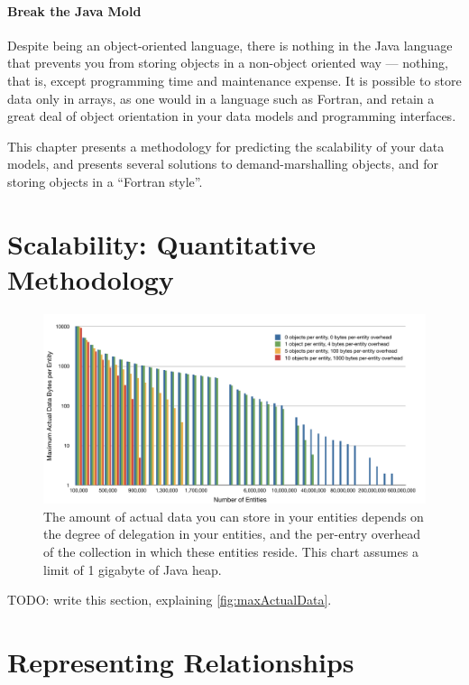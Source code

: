 \paragraph{Break the Java Mold} Despite being an object-oriented language, there
is nothing in the Java language that prevents you from storing objects in a
non-object oriented way --- nothing, that is, except programming time and
maintenance expense. It is possible to store data only in arrays, as one would in
a language such as Fortran, and retain a great deal of object orientation in your
data models and programming interfaces. 

This chapter presents a methodology for predicting the scalability of your data
models, and presents several solutions to demand-marshalling objects, and for
storing objects in a ``Fortran style''.

\section{Scalability: Quantitative Methodology}

\begin{figure}
\centering
	\includegraphics[width=\textwidth]{part4/Figures/maxActualData}
	\caption{The amount of actual data you can store in your entities depends on
	the degree of delegation in your entities, and the per-entry overhead of the collection in which these entities
	reside. This chart assumes a limit of 1 gigabyte of Java heap.}
	\label{fig:maxActualData}
\end{figure}

TODO: write this section, explaining \autoref{fig:maxActualData}.

\section{Representing Relationships}

